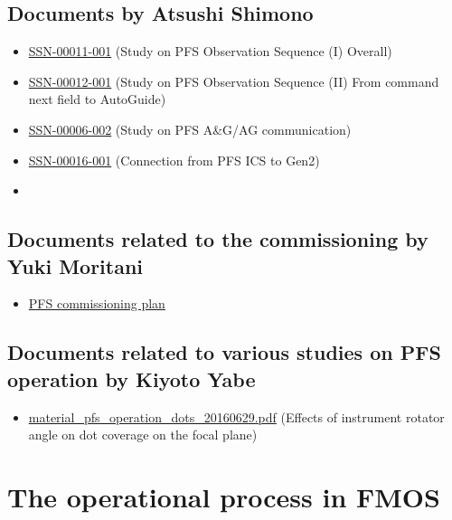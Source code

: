 \documentclass[a4paper]{article}
\begin{document}
\subsection{Documents by Atsushi Shimono \label{appendix:documents:shimono}}
\begin{itemize}
\item \href{http://sumire.pbworks.com/w/file/102897967/SSN-00011-001-ICSSeq-1-Overall.pptx}{SSN-00011-001} (Study on PFS Observation Sequence (I) Overall)
\item \href{http://sumire.pbworks.com/w/file/94687160/SSN-00012-001-ICSSeq-2-CommandToAG.pptx}{SSN-00012-001} (Study on PFS Observation Sequence (II) From command next field to AutoGuide)
\item \href{http://sumire.pbworks.com/w/file/93138234/SSN-00006-001-AGtoGen2.pptx}{SSN-00006-002} (Study on PFS A\&G/AG communication)
\item \href{http://sumire.pbworks.com/w/file/101124121/SSN-00016-001-Gen2-OBCP.pptx}{SSN-00016-001} (Connection from PFS ICS to Gen2)
\item 
\end{itemize}

\subsection{Documents related to the commissioning by Yuki Moritani\label{appendix:documents:moritani}}
\begin{itemize}
\item \href{}{PFS commissioning plan}
\end{itemize}

\subsection{Documents related to various studies on PFS operation by Kiyoto Yabe\label{appendix:documents:yabe}}
\begin{itemize}
\item \href{http://member.ipmu.jp/kiyoto.yabe/PFS/tmp/material_pfs_operation_dots_20160629.pdf}{material\_pfs\_operation\_dots\_20160629.pdf} (Effects of instrument rotator angle on dot coverage on the focal plane)
\end{itemize}

\section{The operational process in FMOS}
\end{document}
